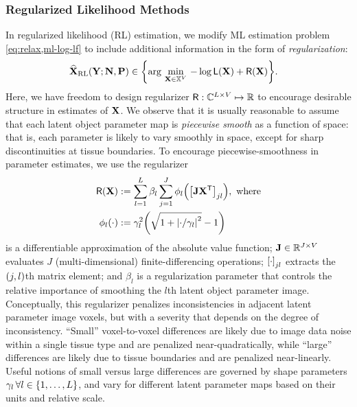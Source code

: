 \subsubsection{Regularized Likelihood Methods}
\label{sss,relax,meth,est,rls}

In regularized likelihood (RL) estimation,
we modify ML estimation problem \eqref{eq:relax,ml-log-lf}
to include additional information
in the form of \emph{regularization}:
\begin{align}
	\estaRL{\bmX}{\bmY; \bmN, \bmP} &\in
	\set{\argmin{\bmX \in \setX^V} -\log{\Lf{\bmX}} + \Rega{\bmX}}.
	\label{eq:relax,rl-est}
\end{align}
Here,
we have freedom to design regularizer 
$\mathsf{R} : \mathbb{C}^{L \times V} \mapsto \mathbb{R}$ 
to encourage desirable structure
in estimates of $\mathbf{X}$. 
We observe
that it is usually reasonable
to assume that each latent object parameter map
is \emph{piecewise smooth} as a function of space:
that is, 
each parameter is likely 
to vary smoothly in space,
except for sharp discontinuities 
at tissue boundaries.
To encourage piecewise-smoothness 
in parameter estimates,
we use the regularizer 
\begin{align}
	\Rega{\bmX} &:= \sum_{l=1}^L \beta_l \sum_{j=1}^J
	\phi_l\paren{\brac{\bmJ\bmX\tpose}_{jl}}, \where
	\label{eq:relax,reg} \\
	\phi_l\paren{\cdot} &:= 
	\gamma_l^2 \paren{\sqrt{1 + \abs{\cdot/\gamma_l}^2} - 1}
\end{align}
is a differentiable approximation
of the absolute value function;
$\mathbf{J} \in \mathbb{R}^{J\times V}$ 
evaluates $J$ (multi-dimensional) finite-differencing operations;
$\brac{\cdot}_{jl}$ extracts the $\paren{j,l}$th matrix element;
and $\beta_l$ is a regularization parameter
that controls the relative importance
of smoothing the $l$th latent object parameter image.
Conceptually,
this regularizer penalizes inconsistencies 
in adjacent latent parameter image voxels,
but with a severity that depends
on the degree of inconsistency. 
``Small'' voxel-to-voxel differences 
are likely due to image data noise
within a single tissue type
and are penalized near-quadratically, 
while ``large'' differences
are likely due to tissue boundaries
and are penalized near-linearly.
Useful notions 
of small versus large differences
are governed by shape parameters 
$\gamma_l\, \forall l\in\set{1,\dots,L}$,
and vary for different latent parameter maps
based on their units and relative scale.

